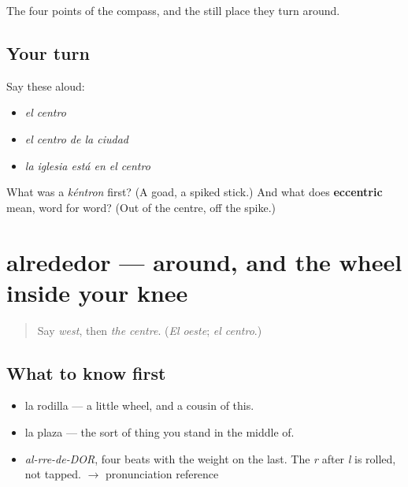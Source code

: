 \begin{grammarlens}[title={What you've built}]
The four points of the compass, and the still place they turn around.
\end{grammarlens}

\subsection*{Your turn}
Say these aloud:

\begin{itemize}
\raggedright
  \item \emph{el centro}
  \item \emph{el centro de la ciudad}
  \item \emph{la iglesia está en el centro}
\end{itemize}

\begin{tcolorbox}[breakable,colback=teal!4,colframe=teal!35!black,title={Before you move on}]
What was a \emph{kéntron} first? (A goad, a spiked stick.) And what does \textbf{eccentric} mean, word for word? (Out of the centre, off the spike.)
\end{tcolorbox}
\section[alrededor]{alrededor — around, and the wheel inside your knee}

\label{lesson:ES-C347-alrededor}



\begin{quote}
Say \emph{west}, then \emph{the centre}. (\emph{El oeste}; \emph{el centro}.)
\end{quote}

\subsection*{What to know first}
\begin{itemize}
\raggedright
  \item la rodilla — a little wheel, and a cousin of this.
  \item la plaza — the sort of thing you stand in the middle of.
\end{itemize}

\begin{sounds}
\begin{itemize}
\raggedright
  \item \emph{al-rre-de-DOR}, four beats with the weight on the last. The \emph{r} after \emph{l} is rolled, not tapped. $\to$ pronunciation reference
\end{itemize}
\end{sounds}

